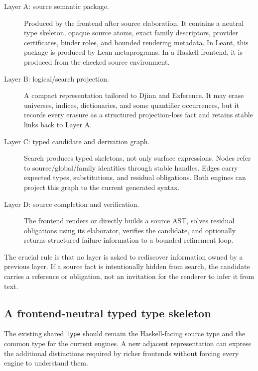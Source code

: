 \documentclass[11pt]{article}
\newcommand{\code}[1]{\texttt{#1}}
\newcommand{\Leant}{\textsf{Leant}}
\newcommand{\Djinn}{Djinn}
\newcommand{\Exference}{Exference}
\begin{document}
\begin{description}
  \item[Layer A: source semantic package.]
    Produced by the frontend after source elaboration.  It contains a neutral
    type skeleton, opaque source atoms, exact family descriptors, provider
    certificates, binder roles, and bounded rendering metadata.  In \Leant{},
    this package is produced by Lean metaprograms.  In a Haskell frontend, it
    is produced from the checked source environment.

  \item[Layer B: logical/search projection.]
    A compact representation tailored to \Djinn{} and \Exference{}.  It may
    erase universes, indices, dictionaries, and some quantifier occurrences,
    but it records every erasure as a structured projection-loss fact and
    retains stable links back to Layer A.

  \item[Layer C: typed candidate and derivation graph.]
    Search produces typed skeletons, not only surface expressions.  Nodes
    refer to source/global/family identities through stable handles.  Edges
    carry expected types, substitutions, and residual obligations.  Both
    engines can project this graph to the current generated syntax.

  \item[Layer D: source completion and verification.]
    The frontend renders or directly builds a source AST, solves residual
    obligations using its elaborator, verifies the candidate, and optionally
    returns structured failure information to a bounded refinement loop.
\end{description}

The crucial rule is that no layer is asked to rediscover information owned by a
previous layer.  If a source fact is intentionally hidden from search, the
candidate carries a reference or obligation, not an invitation for the
renderer to infer it from text.

\subsection{A frontend-neutral typed type skeleton}

The existing shared \code{Type} should remain the Haskell-facing source type
and the common type for the current engines.  A new adjacent representation can
express the additional distinctions required by richer frontends without
forcing every engine to understand them.
\end{document}
